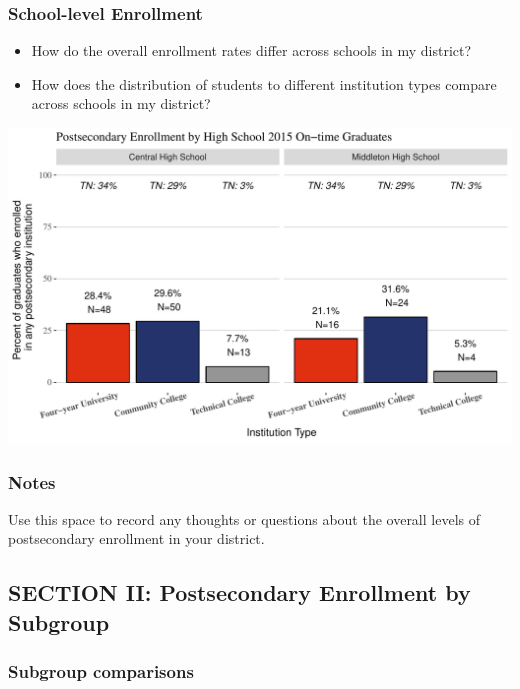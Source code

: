 \documentclass[11pt,]{article}
\providecommand{\tightlist}{%
  \setlength{\itemsep}{0pt}\setlength{\parskip}{0pt}}
\begin{document}
\newpage

\subsubsection{School-level Enrollment}\label{school-level-enrollment}

\begin{itemize}
\tightlist
\item
  How do the overall enrollment rates differ across schools in my
  district?
\item
  How does the distribution of students to different institution types
  compare across schools in my district?
\end{itemize}

\includegraphics{20170419_PSWRR_files/figure-latex/Enrollment by School-1.pdf}

\subsubsection{\texorpdfstring{\textbf{Notes}}{Notes}}\label{notes}

Use this space to record any thoughts or questions about the overall
levels of postsecondary enrollment in your district.

\newpage 

\subsection{SECTION II: Postsecondary Enrollment by
Subgroup}\label{section-ii-postsecondary-enrollment-by-subgroup}

\subsubsection{Subgroup comparisons}\label{subgroup-comparisons}
\end{document}

